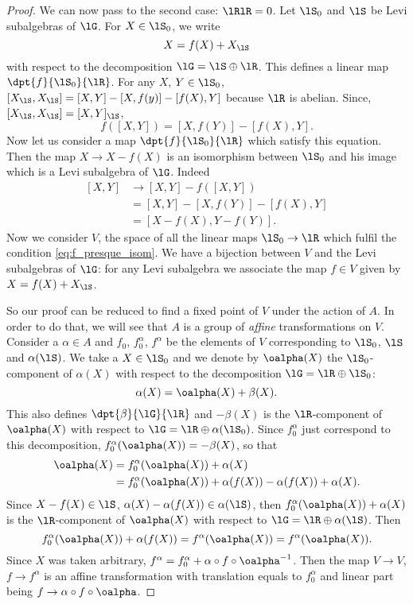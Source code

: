\begin{proof}
We can now pass to the second case: $\lRlR=0$.
Let $\lS_0$ and $\lS$ be Levi subalgebras of $\lG$. For $X\in\lS_0$, we write
\[
   X=f(X)+X_{\lS}
\]
with respect to the decomposition $\lG=\lS\oplus\lR$. This defines a linear map $\dpt{f}{\lS_0}{\lR}$. For any $X$, $Y\in\lS_0$, $[X_{\lS},X_{\lS}]=[X,Y]-[X,f(y)]-[f(X),Y]$ because $\lR$ is abelian. Since, $[X_{\lS},X_{\lS}]=[X,Y]_{\lS}$,
\begin{equation}\label{eq:f_presque_isom}
f([X,Y])=[X,f(Y)]-[f(X),Y].
\end{equation}
Now let us consider a map $\dpt{f}{\lS_0}{\lR}$ which satisfy this equation. Then the map $X\to X-f(X)$ is an isomorphism between $\lS_0$ and his image which is a Levi subalgebra of $\lG$. Indeed
\begin{equation}
\begin{split}
[X,Y]&\to[X,Y]-f([X,Y])\\
     &=[X,Y]-[X,f(Y)]-[f(X),Y]\\
     &=[X-f(X),Y-f(Y)].
\end{split}
\end{equation}
Now we consider $V$, the space of all the linear maps $\lS_0\to\lR$ which fulfil the condition \eqref{eq:f_presque_isom}. We have a bijection between $V$ and the Levi subalgebras of $\lG$: for any Levi subalgebra we associate the map $f\in V$ given by $X=f(X)+X_{\lS}$.

So our proof can be reduced to find a fixed point of $V$ under the action of $A$. In order to do that, we will see that $A$ is a group of \emph{affine} transformations on $V$. Consider a $\alpha\in A$ and $f_0$, $f_0^{\alpha}$, $f^{\alpha}$ be the elements of $V$ corresponding to $\lS_0$, $\lS$ and $\alpha(\lS)$. We take a $X\in\lS_0$ and we denote by $\oalpha(X)$ the $\lS_0$-component of $\alpha(X)$ with respect to the decomposition $\lG=\lR\oplus\lS_0$:
\[
   \alpha(X)=\oalpha(X)+\beta(X).
\]
This also defines $\dpt{\beta}{\lG}{\lR}$ and $-\beta(X)$ is the $\lR$-component of $\oalpha(X)$ with respect to $\lG=\lR\oplus\alpha(\lS_0)$. Since $f_0^{\alpha}$ just correspond to this decomposition, $f_0^{\alpha}(\oalpha(X))=-\beta(X)$, so that
\begin{equation}
\begin{split}
\oalpha(X)&=f_0^{\alpha}(\oalpha(X))+\alpha(X)\\
          &=f_0^{\alpha}(\oalpha(X))+\alpha(f(X))-\alpha(f(X))+\alpha(X).
\end{split}
\end{equation}
Since $X-f(X)\in\lS$, $\alpha(X)-\alpha(f(X))\in\alpha(\lS)$, then $f_0^{\alpha}(\oalpha(X))+\alpha(X)$ is the $\lR$-component of $\oalpha(X)$ with respect to $\lG=\lR\oplus\alpha(\lS)$. Then
\[
   f_0^{\alpha}(\oalpha(X))+\alpha(f(X))=f^{\alpha}(\oalpha(X))=f^{\alpha}(\oalpha(X)).
\]
Since $X$ was taken arbitrary, $f^{\alpha}=f^{\alpha}_0+\alpha\circ f\circ\oalpha^{-1}$. Then the map $V\to V$, $f\to f^{\alpha}$ is an affine transformation with translation equals to $f_0^{\alpha}$ and linear part being $f\to\alpha\circ f\circ\oalpha$.


\end{proof}
